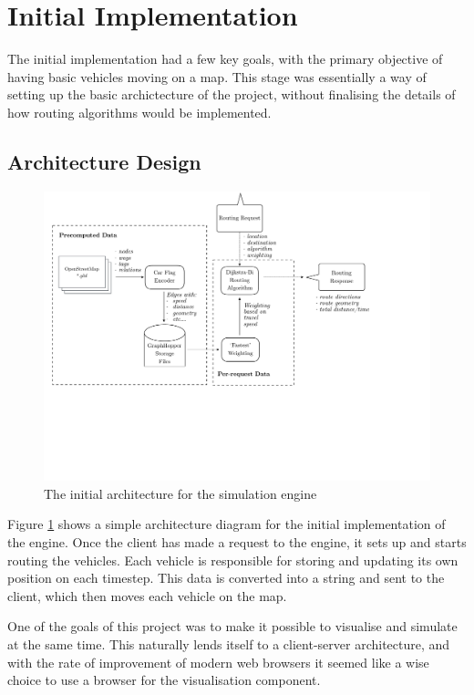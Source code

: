 \documentclass[ %
                    author={Alexander Hill},
                supervisor={Dr. Benjamin Sach},
                    degree={MEng},
                     title={MARMOSET},
                  subtitle={Multi-Agent Route Management using Online Simulation for Efficient Transportation},
                      type={research},
                      year={2016} ]{dissertation}
\begin{document}
\section{Initial Implementation}

The initial implementation had a few key goals, with the primary objective of
having basic vehicles moving on a map. This stage was essentially a way of
setting up the basic archictecture of the project, without finalising the
details of how routing algorithms would be implemented.

\subsection{Architecture Design}

\begin{figure}[h]
    \centering
    \includegraphics[scale=0.5,page=2,clip,trim=0 17cm 3cm 0]{architecture}
    \caption{The initial architecture for the simulation engine}\label{fig:init-arch}
\end{figure}

Figure \ref{fig:init-arch} shows a simple architecture diagram for the initial
implementation of the engine. Once the client has made a request to the engine,
it sets up and starts routing the vehicles. Each vehicle is responsible for
storing and updating its own position on each timestep. This data is converted
into a string and sent to the client, which then moves each vehicle on the map.

One of the goals of this project was to make it possible to visualise and
simulate at the same time. This naturally lends itself to a client-server
architecture, and with the rate of improvement of modern web browsers it seemed
like a wise choice to use a browser for the visualisation component.
\end{document}
